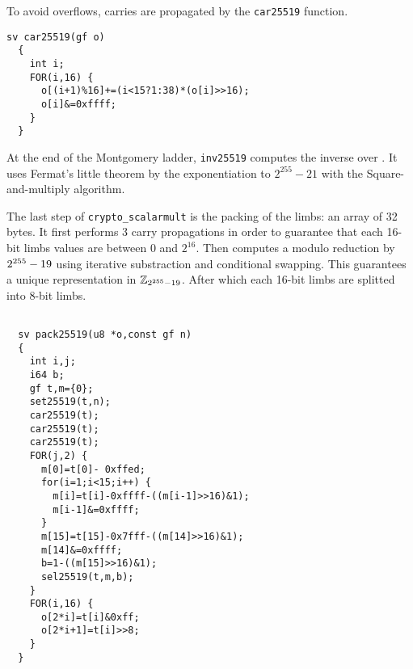   To avoid overflows, carries are propagated by the \texttt{car25519} function.
  \begin{lstlisting}[language=Ctweetnacl]
  sv car25519(gf o)
  {
    int i;
    FOR(i,16) {
      o[(i+1)%16]+=(i<15?1:38)*(o[i]>>16);
      o[i]&=0xffff;
    }
  }
  \end{lstlisting}

  At the end of the Montgomery ladder, \texttt{inv25519} computes the inverse over \Zfield.
  It uses Fermat's little theorem by the exponentiation to
  $2^{255}-21$ with the Square-and-multiply algorithm.

  The last step of \texttt{crypto\_scalarmult} is the packing of the limbs: an array of 32 bytes.
  It first performs 3 carry propagations in order to guarantee
  that each 16-bit limbs values are between $0$ and $2^{16}$.
  Then computes a modulo reduction by $2^{255}-19$ using iterative substraction and
  conditional swapping. This guarantees a unique representation in $\mathbb{Z}_{2^{255}-19}$.
  After which each 16-bit limbs are splitted into 8-bit limbs.
  \begin{lstlisting}[language=Ctweetnacl]

  sv pack25519(u8 *o,const gf n)
  {
    int i,j;
    i64 b;
    gf t,m={0};
    set25519(t,n);
    car25519(t);
    car25519(t);
    car25519(t);
    FOR(j,2) {
      m[0]=t[0]- 0xffed;
      for(i=1;i<15;i++) {
        m[i]=t[i]-0xffff-((m[i-1]>>16)&1);
        m[i-1]&=0xffff;
      }
      m[15]=t[15]-0x7fff-((m[14]>>16)&1);
      m[14]&=0xffff;
      b=1-((m[15]>>16)&1);
      sel25519(t,m,b);
    }
    FOR(i,16) {
      o[2*i]=t[i]&0xff;
      o[2*i+1]=t[i]>>8;
    }
  }
  \end{lstlisting}

